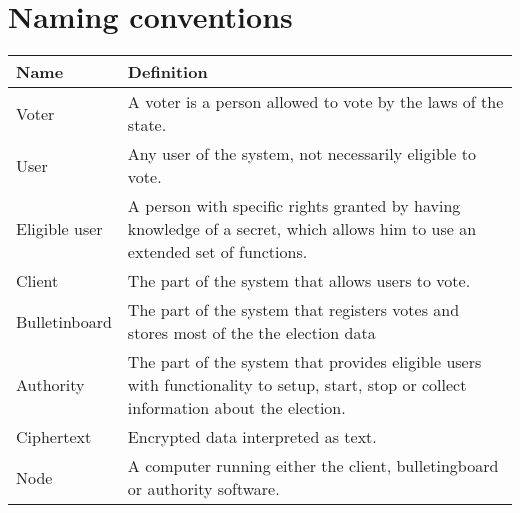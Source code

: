 \chapter{Naming conventions}

\begin{tabularx}{460pt}{|l|X|}
  \hline
 \textbf{Name} & \textbf{Definition} \\
  \hline
  Voter & A voter is a person allowed to vote by the laws of the state. \\
  \hline
  User & Any user of the system, not necessarily eligible to vote. \\
  \hline
 Eligible user & A person with specific rights granted by having knowledge of a secret, which allows him to use an extended set of functions. \\
  \hline
Client & The part of the system that allows users to vote. \\
  \hline
 Bulletinboard & The part of the system that registers votes and stores most of the the election data \\
  \hline
 Authority & The part of the system that provides eligible users with functionality to setup, start, stop or collect information about the election. \\
  \hline
 Ciphertext & Encrypted data interpreted as text. \\
  \hline
 Node & A computer running either the client, bulletingboard or authority software. \\
  \hline
\end{tabularx}